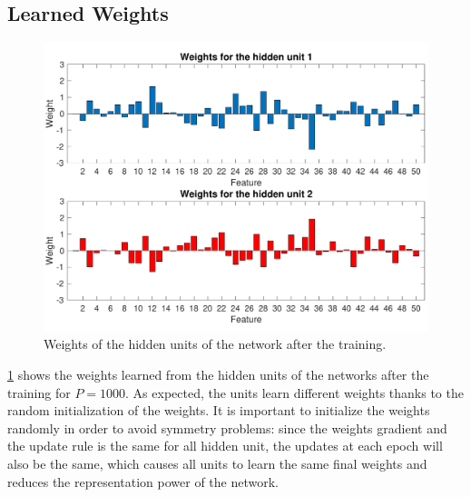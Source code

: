 \subsection{Learned Weights}
\begin{figure}[t]
	\centering
	\includegraphics[width=\columnwidth]{figures/weights_p_1000}
    \caption{Weights of the hidden units of the network after the training.}
	\label{fig:weights}
\end{figure}

\cref{fig:weights} shows the weights learned from the hidden units of the networks after the training for $P = 1000$.
As expected, the units learn different weights thanks to the random initialization of the weights.
It is important to initialize the weights randomly in order to avoid symmetry problems:
since the weights gradient and the update rule is the same for all hidden unit, the updates at each epoch will also be the same, which causes all units to learn the same final weights and reduces the representation power of the network.

